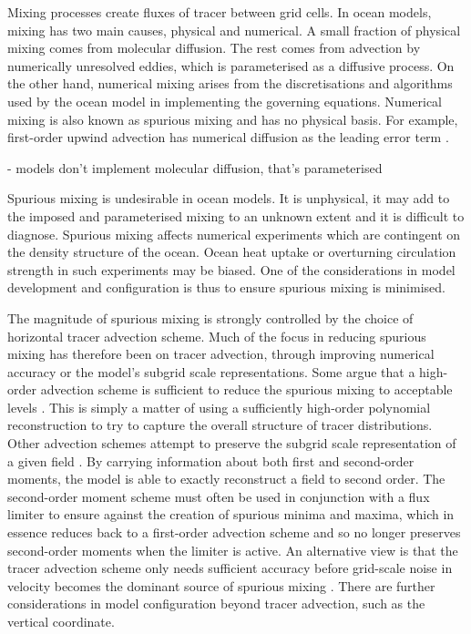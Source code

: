 Mixing processes create fluxes of tracer between grid cells. In ocean models, mixing has two main causes, physical and numerical. A small fraction of physical mixing comes from molecular diffusion. The rest comes from advection by numerically unresolved eddies, which is parameterised as a diffusive process. On the other hand, numerical mixing arises from the discretisations and algorithms used by the ocean model in implementing the governing equations. Numerical mixing is also known as spurious mixing and has no physical basis. For example, first-order upwind advection has numerical diffusion as the leading error term \citep{gentry66}.

- models don't implement molecular diffusion, that's parameterised

Spurious mixing is undesirable in ocean models. It is unphysical, it may add to the imposed and parameterised mixing to an unknown extent and it is difficult to diagnose. Spurious mixing affects numerical experiments which are contingent on the density structure of the ocean. Ocean heat uptake or overturning circulation strength in such experiments may be biased. One of the considerations in model development and configuration is thus to ensure spurious mixing is minimised.

The magnitude of spurious mixing is strongly controlled by the choice of horizontal tracer advection scheme. Much of the focus in reducing spurious mixing has therefore been on tracer advection, through improving numerical accuracy or the model's subgrid scale representations. Some argue that a high-order advection scheme is sufficient to reduce the spurious mixing to acceptable levels \citep{daru04}. This is simply a matter of using a sufficiently high-order polynomial reconstruction to try to capture the overall structure of tracer distributions. Other advection schemes attempt to preserve the subgrid scale representation of a given field \citep{prather86}. By carrying information about both first and second-order moments, the model is able to exactly reconstruct a field to second order. The second-order moment scheme must often be used in conjunction with a flux limiter to ensure against the creation of spurious minima and maxima, which in essence reduces back to a first-order advection scheme and so no longer preserves second-order moments when the limiter is active. An alternative view is that the tracer advection scheme only needs sufficient accuracy before grid-scale noise in velocity becomes the dominant source of spurious mixing \citep{ilicak12}. There are further considerations in model configuration beyond tracer advection, such as the vertical coordinate.

